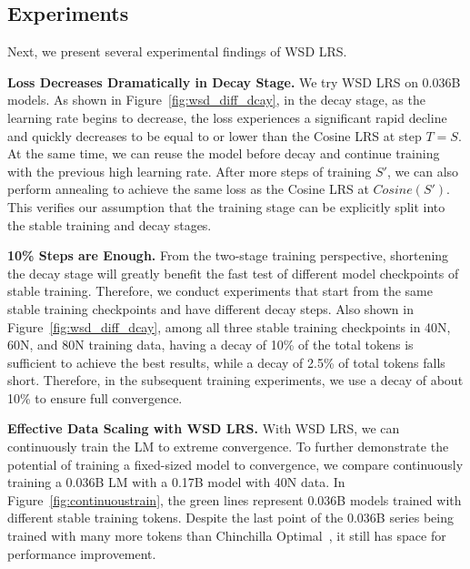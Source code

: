 \documentclass[dvipsnames]{article}
\begin{document}
\vspace{-6mm}
\subsection{Experiments}
\label{sec:wsd_experiments_continoustrain}
Next, we present several experimental findings of WSD LRS.

\textbf{Loss Decreases Dramatically in Decay Stage. } We try WSD LRS on 0.036B models. As shown in Figure~\ref{fig:wsd_diff_dcay}, in the decay stage, as the learning rate begins to decrease, the loss experiences a significant rapid decline and quickly decreases to be equal to or lower than the Cosine LRS at step $T=S$. At the same time, we can reuse the model before decay and continue training with the previous high learning rate. After more steps of training $S'$, we can also perform annealing to achieve the same loss as the Cosine LRS at $Cosine(S')$. This verifies our assumption that the training stage can be explicitly split into the stable training and decay stages.

\textbf{10\% Steps are Enough.} From the two-stage training perspective, shortening the decay stage will greatly benefit the fast test of different model checkpoints of stable training. Therefore, we conduct experiments that start from the same stable training checkpoints and have different decay steps. Also shown in Figure~\ref{fig:wsd_diff_dcay}, among all three stable training checkpoints in 40N, 60N, and 80N training data, having a decay of 10\% of the total tokens is sufficient to achieve the best results, while a decay of 2.5\% of total tokens falls short. Therefore, in the subsequent training experiments, we use a decay of about 10\% to ensure full convergence. 

\textbf{Effective Data Scaling with WSD LRS.} With WSD LRS, we can continuously train the LM to extreme convergence. To further demonstrate the potential of training a fixed-sized model to convergence, we compare continuously training a 0.036B LM with a 0.17B model with 40N data. 
In Figure~\ref{fig:continuoustrain}, the green lines represent 0.036B models trained with different stable training tokens. Despite the last point of the 0.036B series being trained with many more tokens than Chinchilla Optimal~\citep{hoffmann2022training}, it still has space for performance improvement. 

\end{document}
